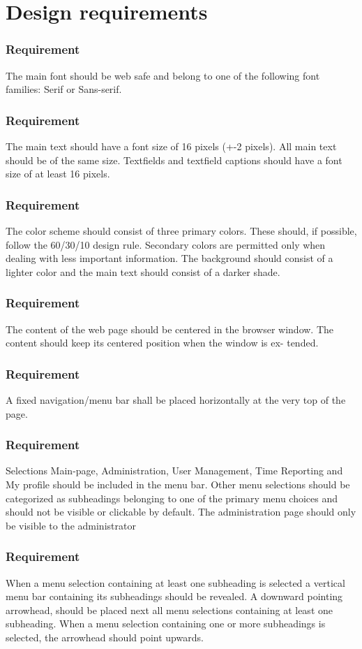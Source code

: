 \documentclass{article}
\begin{document}
\section{Design requirements}

\subsubsection{Requirement}
The main font should be web safe and belong to one of the following font
families: Serif or Sans-serif.
\subsubsection{Requirement}
The main text should have a font size of 16 pixels (+-2 pixels). All main
text should be of the same size.
Textfields and textfield captions should have a font size of at least 16
pixels.
\subsubsection{Requirement}
The color scheme should consist of three primary colors. These should, if
possible, follow the 60/30/10 design rule. Secondary colors are permitted
only when dealing with less important information.
The background should consist of a lighter color and the main text should
consist of a darker shade.
\subsubsection{Requirement}
The content of the web page should be centered in the browser window.
The content should keep its centered position when the window is ex-
tended.
\subsubsection{Requirement}
A fixed navigation/menu bar shall be placed horizontally at the very top
of the page.
\subsubsection{Requirement}
Selections Main-page, Administration, User Management, Time Reporting
and My profile should be included in the menu bar. Other menu selections
should be categorized as subheadings belonging to one of the primary
menu choices and should not be visible or clickable by default.
The administration page should only be visible to the administrator
\subsubsection{Requirement}
When a menu selection containing at least one subheading is selected a
vertical menu bar containing its subheadings should be revealed.
A downward pointing arrowhead, should be placed next all menu selections containing at least one subheading. 
When a menu selection containing one or more subheadings is selected, the arrowhead should point
upwards.
\end{document}
